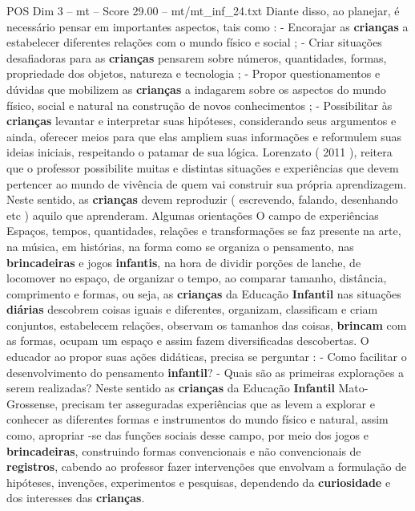 \begin{textsample}{POS Dim 3 – mt – Score 29.00 – mt/mt\_inf\_24.txt}
Diante disso, ao planejar, é necessário pensar em importantes aspectos, tais como : - Encorajar as \textbf{crianças} a estabelecer diferentes relações com o mundo físico e social ; - Criar situações desafiadoras para as \textbf{crianças} pensarem sobre números, quantidades, formas, propriedade dos objetos, natureza e tecnologia ; - Propor questionamentos e dúvidas que mobilizem as \textbf{crianças} a indagarem sobre os aspectos do mundo físico, social e natural na construção de novos conhecimentos ; - Possibilitar às \textbf{crianças} levantar e interpretar suas hipóteses, considerando seus argumentos e ainda, oferecer meios para que elas ampliem suas informações e reformulem suas ideias iniciais, respeitando o patamar de sua lógica.
Lorenzato ( 2011 ), reitera que o professor possibilite muitas e distintas situações e experiências que devem pertencer ao mundo de vivência de quem vai construir sua própria aprendizagem.
Neste sentido, as \textbf{crianças} devem reproduzir ( escrevendo, falando, desenhando etc ) aquilo que aprenderam.
Algumas orientações O campo de experiências Espaços, tempos, quantidades, relações e transformações se faz presente na arte, na música, em histórias, na forma como se organiza o pensamento, nas \textbf{brincadeiras} e jogos \textbf{infantis}, na hora de dividir porções de lanche, de locomover no espaço, de organizar o tempo, ao comparar tamanho, distância, comprimento e formas, ou seja, as \textbf{crianças} da Educação \textbf{Infantil} nas situações \textbf{diárias} descobrem coisas iguais e diferentes, organizam, classificam e criam conjuntos, estabelecem relações, observam os tamanhos das coisas, \textbf{brincam} com as formas, ocupam um espaço e assim fazem diversificadas descobertas.
O educador ao propor suas ações didáticas, precisa se perguntar : - Como facilitar o desenvolvimento do pensamento \textbf{infantil}? - Quais são as primeiras explorações a serem realizadas?
Neste sentido as \textbf{crianças} da Educação \textbf{Infantil} Mato-Grossense, precisam ter asseguradas experiências que as levem a explorar e conhecer as diferentes formas e instrumentos do mundo físico e natural, assim como, apropriar -se das funções sociais desse campo, por meio dos jogos e \textbf{brincadeiras}, construindo formas convencionais e não convencionais de \textbf{registros}, cabendo ao professor fazer intervenções que envolvam a formulação de hipóteses, invenções, experimentos e pesquisas, dependendo da \textbf{curiosidade} e dos interesses das \textbf{crianças}.

\end{textsample}

